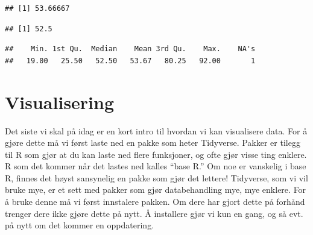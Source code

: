 \documentclass[
]{article}
\newenvironment{Shaded}{\begin{snugshade}}{\end{snugshade}}
\newcommand{\CommentTok}[1]{\textcolor[rgb]{0.56,0.35,0.01}{\textit{#1}}}
\newcommand{\DataTypeTok}[1]{\textcolor[rgb]{0.13,0.29,0.53}{#1}}
\newcommand{\KeywordTok}[1]{\textcolor[rgb]{0.13,0.29,0.53}{\textbf{#1}}}
\newcommand{\NormalTok}[1]{#1}
\newcommand{\OperatorTok}[1]{\textcolor[rgb]{0.81,0.36,0.00}{\textbf{#1}}}
\newcommand{\OtherTok}[1]{\textcolor[rgb]{0.56,0.35,0.01}{#1}}
\begin{document}
\begin{Shaded}
\end{Shaded}

\begin{verbatim}
## [1] 53.66667
\end{verbatim}

\begin{Shaded}
\end{Shaded}

\begin{verbatim}
## [1] 52.5
\end{verbatim}

\begin{Shaded}
\end{Shaded}

\begin{verbatim}
##    Min. 1st Qu.  Median    Mean 3rd Qu.    Max.    NA's 
##   19.00   25.50   52.50   53.67   80.25   92.00       1
\end{verbatim}

\hypertarget{visualisering}{%
\section{Visualisering}\label{visualisering}}

Det siste vi skal på idag er en kort intro til hvordan vi kan
visualisere data. For å gjøre dette må vi først laste ned en pakke som
heter Tidyverse. Pakker er tilegg til R som gjør at du kan laste ned
flere funksjoner, og ofte gjør visse ting enklere. R som det kommer når
det lastes ned kalles ``base R.'' Om noe er vanskelig i base R, finnes
det høyst sansynelig en pakke som gjør det lettere! Tidyverse, som vi
vil bruke mye, er et sett med pakker som gjør databehandling mye, mye
enklere. For å bruke denne må vi først innstalere pakken. Om dere har
gjort dette på forhånd trenger dere ikke gjøre dette på nytt. Å
installere gjør vi kun en gang, og så evt. på nytt om det kommer en
oppdatering.
\end{document}
